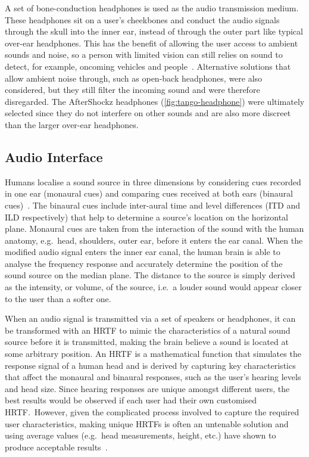\documentclass[]{interact}
\begin{document}
A set of bone-conduction headphones is used as the audio transmission medium.
These headphones sit on a user's cheekbones and conduct the audio signals through the skull into the inner ear, instead of through the outer part like typical over-ear headphones. 
This has the benefit of allowing the user access to ambient sounds and noise, so a person with limited vision can still relies on sound to detect, for example, oncoming vehicles and people~\cite{lichtenstein2012headphone}.
Alternative solutions that allow ambient noise through, such as open-back headphones, were also considered, but they still filter the incoming sound and were therefore disregarded.
The AfterShockz headphones (\cref{fig:tango-headphone}) were ultimately selected since they do not interfere on other sounds and are also more discreet than the larger over-ear headphones. 

\subsection{Audio Interface}

Humans localise a sound source in three dimensions by considering cues recorded in one ear (monaural cues) and comparing cues received at both ears (binaural cues)~\cite{blauert1997spatial,blauert1969sound}.
The binaural cues include inter-aural time and level differences (ITD and ILD respectively) that help to determine a source's location on the horizontal plane.
Monaural cues are taken from the interaction of the sound with the human anatomy, e.g.\ head, shoulders, outer ear, before it enters the ear canal.
When the modified audio signal enters the inner ear canal, the human brain is able to analyse the frequency response and accurately determine the position of the sound source on the median plane. 
The distance to the source is simply derived as the intensity, or volume, of the source, i.e.\ a louder sound would appear closer to the user than a softer one. 

When an audio signal is transmitted via a set of speakers or headphones, it can be transformed with an HRTF to mimic the characteristics of a natural sound source before it is transmitted, making the brain believe a sound is located at some arbitrary position.
An HRTF is a mathematical function that simulates the response signal of a human head and is derived by capturing key characteristics that affect the monaural and binaural responses, such as the user's hearing levels and head size.
Since hearing responses are unique amongst different users, the best results would be observed if each user had their own customised HRTF.\
However, given the complicated process involved to capture the required user characteristics, making unique HRTFs is often an untenable solution and using average values (e.g.\ head measurements, height, etc.) have shown to produce acceptable results~\citep{gardner1995hrtf}.
\end{document}
